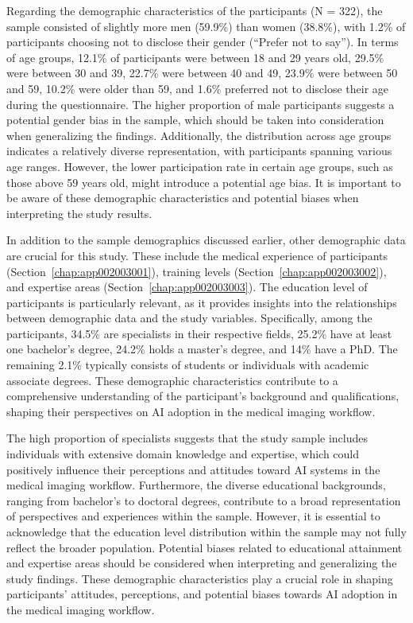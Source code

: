 Regarding the demographic characteristics of the participants (N = 322), the sample consisted of slightly more men (59.9\%) than women (38.8\%), with 1.2\% of participants choosing not to disclose their gender (``Prefer not to say'').
In terms of age groups, 12.1\% of participants were between 18 and 29 years old, 29.5\% were between 30 and 39, 22.7\% were between 40 and 49, 23.9\% were between 50 and 59, 10.2\% were older than 59, and 1.6\% preferred not to disclose their age during the questionnaire.
The higher proportion of male participants suggests a potential gender bias in the sample, which should be taken into consideration when generalizing the findings.
Additionally, the distribution across age groups indicates a relatively diverse representation, with participants spanning various age ranges.
However, the lower participation rate in certain age groups, such as those above 59 years old, might introduce a potential age bias.
It is important to be aware of these demographic characteristics and potential biases when interpreting the study results.

In addition to the sample demographics discussed earlier, other demographic data are crucial for this study.
These include the medical experience of participants (Section~\ref{chap:app002003001}), training levels (Section~\ref{chap:app002003002}), and expertise areas (Section~\ref{chap:app002003003}).
The education level of participants is particularly relevant, as it provides insights into the relationships between demographic data and the study variables.
Specifically, among the participants, 34.5\% are specialists in their respective fields, 25.2\% have at least one bachelor's degree, 24.2\% holds a master's degree, and 14\% have a PhD.
The remaining 2.1\% typically consists of students or individuals with academic associate degrees.
These demographic characteristics contribute to a comprehensive understanding of the participant's background and qualifications, shaping their perspectives on \ac{AI} adoption in the medical imaging workflow.



The high proportion of specialists suggests that the study sample includes individuals with extensive domain knowledge and expertise, which could positively influence their perceptions and attitudes toward AI systems in the medical imaging workflow.
Furthermore, the diverse educational backgrounds, ranging from bachelor's to doctoral degrees, contribute to a broad representation of perspectives and experiences within the sample.
However, it is essential to acknowledge that the education level distribution within the sample may not fully reflect the broader population.
Potential biases related to educational attainment and expertise areas should be considered when interpreting and generalizing the study findings.
These demographic characteristics play a crucial role in shaping participants' attitudes, perceptions, and potential biases towards \ac{AI} adoption in the medical imaging workflow.

